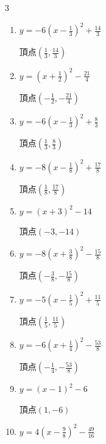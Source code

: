 \begin{multicols}{3}
\begin{enumerate}
        $\displaystyle 頂点\left( \frac{1}{9} , \frac{37}{9} \right)$

  \item $\displaystyle y=-6\left( x-\frac{1}{3}\right)^{2}+\frac{14}{3}$

        $\displaystyle 頂点\left( \frac{1}{3} , \frac{14}{3} \right)$

  \item $\displaystyle y=\left( x+\frac{1}{2}\right)^{2}-\frac{21}{4}$

        $\displaystyle 頂点\left( -\frac{1}{2} , -\frac{21}{4} \right)$

  \item $\displaystyle y=-6\left( x-\frac{1}{3}\right)^{2}+\frac{8}{3}$

        $\displaystyle 頂点\left( \frac{1}{3} , \frac{8}{3} \right)$

\columnbreak %

\resetques

  \item $\displaystyle y=-8\left( x-\frac{1}{8}\right)^{2}+\frac{17}{8}$

        $\displaystyle 頂点\left( \frac{1}{8} , \frac{17}{8} \right)$

  \item $\displaystyle y=\left( x+3\right)^{2}-14$

        $\displaystyle 頂点\left( -3 , -14 \right)$

  \item $\displaystyle y=-8\left( x+\frac{3}{8}\right)^{2}-\frac{15}{8}$

        $\displaystyle 頂点\left( -\frac{3}{8} , -\frac{15}{8} \right)$

  \item $\displaystyle y=-5\left( x-\frac{1}{5}\right)^{2}+\frac{11}{5}$

        $\displaystyle 頂点\left( \frac{1}{5} , \frac{11}{5} \right)$

  \item $\displaystyle y=-6\left( x+\frac{1}{4}\right)^{2}-\frac{53}{8}$

        $\displaystyle 頂点\left( -\frac{1}{4} , -\frac{53}{8} \right)$

  \item $\displaystyle y=\left( x-1\right)^{2}-6$

        $\displaystyle 頂点\left( 1 , -6 \right)$

  \item $\displaystyle y=4\left( x-\frac{9}{8}\right)^{2}-\frac{49}{16}$


\end{enumerate}
\end{multicols}
